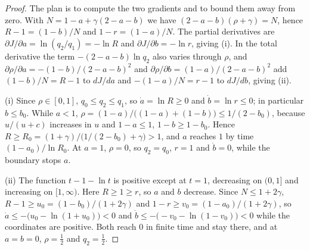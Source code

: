 \begin{refsection}

\begin{proof}
The plan is to compute the two gradients and to bound them away from zero. With $N=1-a+\gamma(2-a-b)$ we have $(2-a-b)(\rho+\gamma)=N$, hence $R-1=(1-b)/N$ and $1-r=(1-a)/N$. The partial derivatives are $\partial J/\partial a=\ln(q_2/q_1)=-\ln R$ and $\partial J/\partial b=-\ln r$, giving (i). In the total derivative the term $-(2-a-b)\ln q_2$ also varies through $\rho$, and $\partial\rho/\partial a=-(1-b)/(2-a-b)^2$ and $\partial\rho/\partial b=(1-a)/(2-a-b)^2$ add $(1-b)/N=R-1$ to $dJ/da$ and $-(1-a)/N=r-1$ to $dJ/db$, giving (ii).

(i) Since $\rho\in[0,1]$, $q_0\le q_2\le q_1$, so $\dot a=\ln R\ge0$ and $\dot b=\ln r\le0$; in particular $b\le b_0$. While $a<1$, $\rho=(1-a)/\bigl((1-a)+(1-b)\bigr)\le1/(2-b_0)$, because $u/(u+c)$ increases in $u$ and $1-a\le1$, $1-b\ge1-b_0$. Hence $R\ge R_0=(1+\gamma)/\bigl(1/(2-b_0)+\gamma\bigr)>1$, and $a$ reaches $1$ by time $(1-a_0)/\ln R_0$. At $a=1$, $\rho=0$, so $q_2=q_0$, $r=1$ and $\dot b=0$, while the boundary stops $a$.

(ii) The function $t-1-\ln t$ is positive except at $t=1$, decreasing on $(0,1]$ and increasing on $[1,\infty)$. Here $R\ge1\ge r$, so $a$ and $b$ decrease. Since $N\le1+2\gamma$, $R-1\ge u_0=(1-b_0)/(1+2\gamma)$ and $1-r\ge v_0=(1-a_0)/(1+2\gamma)$, so $\dot a\le-\bigl(u_0-\ln(1+u_0)\bigr)<0$ and $\dot b\le-\bigl(-v_0-\ln(1-v_0)\bigr)<0$ while the coordinates are positive. Both reach $0$ in finite time and stay there, and at $a=b=0$, $\rho=\frac12$ and $q_2=\frac12$.
\end{proof}


\end{refsection}
